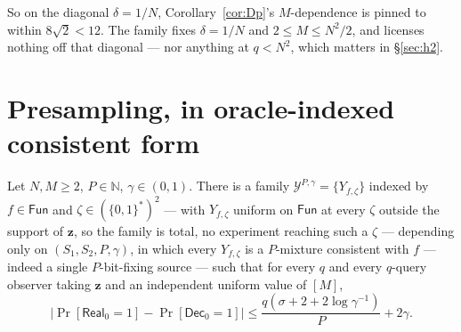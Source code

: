 \documentclass{aicr-solution}
\newcommand{\Fun}{\mathsf{Fun}}
\newcommand{\Real}{\mathsf{Real}}
\newcommand{\Dec}{\mathsf{Dec}}
\newcommand{\Prob}[1]{\Pr\!\left[#1\right]}
\newcommand{\bits}{\{0,1\}}
\newcommand{\vz}{\mathbf{z}}
\begin{document}
So on the diagonal $\delta = 1/N$, Corollary~\ref{cor:Dp}'s $M$-dependence is
pinned to within $8\sqrt2 < 12$. The family fixes $\delta = 1/N$ and
$2 \le M \le N^{2}/2$, and licenses nothing off that diagonal --- nor anything at
$q < N^{2}$, which matters in \S\ref{sec:h2}.

\section{Presampling, in oracle-indexed consistent form}\label{sec:presampling}

\begin{lemma}\label{lem:P}
Let $N,M \ge 2$, $P \in \mathbb{N}$, $\gamma \in (0,1)$. There is a family
$\mathcal{Y}^{P,\gamma} = \{Y_{f,\zeta}\}$ indexed by $f \in \Fun$ and
$\zeta \in (\bits^{*})^{2}$ --- with $Y_{f,\zeta}$ uniform on $\Fun$ at every
$\zeta$ outside the support of $\vz$, so the family is total, no experiment
reaching such a $\zeta$ --- depending only on $(S_1,S_2,P,\gamma)$, in which every
$Y_{f,\zeta}$ is a $P$-mixture consistent with $f$ --- indeed a single
$P$-bit-fixing source --- such that for every $q$ and every $q$-query observer
taking $\vz$ and an independent uniform value of $[M]$,
\[
  \bigl|\Prob{\Real_0 = 1} - \Prob{\Dec_0 = 1}\bigr| \le
  \frac{q(\sigma + 2 + 2\log\gamma^{-1})}{P} + 2\gamma .
\]
\end{lemma}
\end{document}
